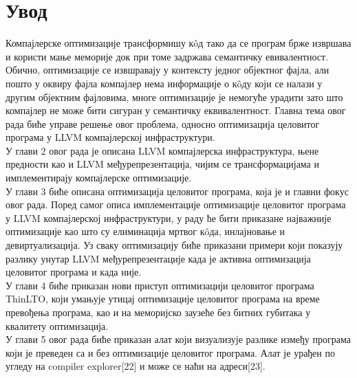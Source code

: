 \documentclass[12pt,oneside]{memoir}
\begin{document}
\frontmatter
\naslovna
\komisija
\tableofcontents*

\mainmatter

\chapter{Увод}

Компајлерске оптимизације трансформишу к\^{o}д тако да се програм брже извршава
и користи мање меморије док при томе задржава семантичку евивалентност.
Обично, оптимизације се извшравају у контексту једног објектног фајла, али
пошто у оквиру фајла компајлер нема информације о к\^{o}ду који се налази у 
другим објектним фајловима, многе оптимизације је немогуће урадити зато што компајлер
не може бити сигуран у семантичку еквивалентност.
Главна тема овог рада биће управе решење овог проблема, односно оптимизација
целовитог програма у LLVM компајлерској инфраструктури.
\\
У глави 2 овог рада је описана LLVM компајлерска инфраструктура, њене предности
као и LLVM међурепрезентација, чијим се трансформацијама и имплементирају
компајлерске оптимизације.
\\
У глави 3 биће описана оптимизација целовитог програма, која је и главни
фокус овог рада.
Поред самог описа имплементације оптимизације целовитог програма у 
LLVM компајлерској инфраструктури, у раду ће бити приказане најважније оптимизације
као што су елиминација мртвог к\^{o}да, инлајновање и девиртуализација.
Уз сваку оптимизацију биће приказани примери који показују разлику унутар 
LLVM међурепрезентације када је активна оптимизација целовитог програма
и када није.
\\
У глави 4 биће приказан нови приступ оптимизацији целовитог програма ThinLTO,
који умањује утицај оптимизације целовитог програма на време превођења програма,
као и на меморијско заузеће без битних губитака у квалитету оптимизација.
\\
У глави 5 овог рада биће приказан алат који визуализује разлике 
између програма који је преведен са и без оптимизације целовитог програма.
Алат је урађен по угледу на compiler explorer[22] и може се наћи на адреси[23].
\end{document}
